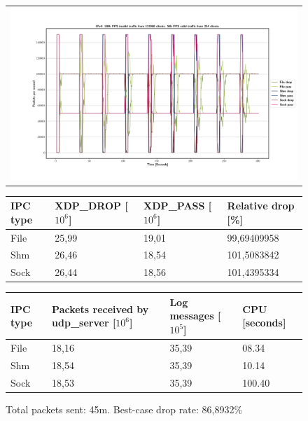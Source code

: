 \begin{figure}[!h]
	\centering
	\scriptsize
	\begin{tabular}{c}
    	\centerline{\includegraphics[width=1.2\textwidth]{images/IPv4_100k_131068_1.png}}
	\end{tabular}
	\begin{tabular}{llll}
		\toprule
		\textbf{IPC type} & \textbf{XDP\_DROP [$10^6$]} & \textbf{XDP\_PASS [$10^6$]} & \textbf{Relative drop [\%]} \\ \midrule 
		File & 25,99 & 19,01 & 99,69409958 \\
        Shm & 26,46 & 18,54 & 101,5083842 \\
        Sock & 26,44 & 18,56 & 101,4395334 \\
	\bottomrule
	\end{tabular}
    \begin{tabular}{llll}
		\toprule
		\textbf{IPC type} & \textbf{Packets received by udp\_server [$10^6$]} & \textbf{Log messages [$10^5$]} & \textbf{CPU [seconds]} \\ \midrule 
		File & 18,16 & 35,39 & 08.34 \\
        Shm & 18,54 & 35,39 & 10.14 \\
        Sock & 18,53 & 35,39 & 100.40 \\
	\bottomrule
	\end{tabular}
	\caption[Simplefail2ban, IPv4, 100k \ac{PPS}, 131068 malicious clients]{Total packets sent: 45m. Best-case drop rate: 86,8932\%}
	\label{fig:data:ipv4:100k:131068}
\end{figure}

